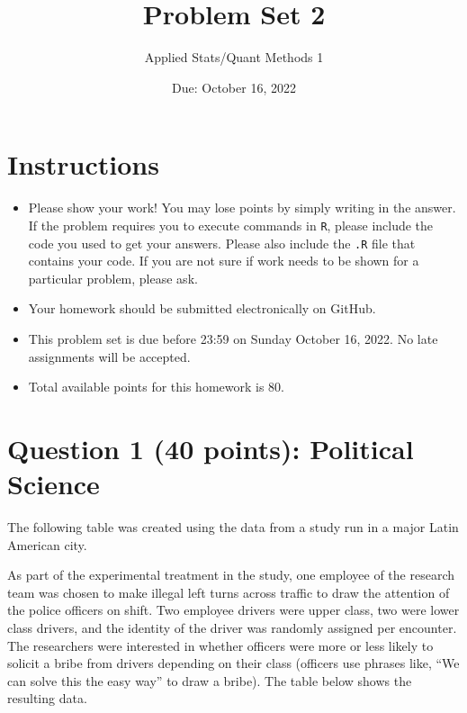 \documentclass[12pt,letterpaper]{article}
\title{Problem Set 2}
\date{Due: October 16, 2022}
\author{Applied Stats/Quant Methods 1}
\begin{document}
	\maketitle
	\section*{Instructions}
\begin{itemize}
	\item Please show your work! You may lose points by simply writing in the answer. If the problem requires you to execute commands in \texttt{R}, please include the code you used to get your answers. Please also include the \texttt{.R} file that contains your code. If you are not sure if work needs to be shown for a particular problem, please ask.
	\item Your homework should be submitted electronically on GitHub.
	\item This problem set is due before 23:59 on Sunday October 16, 2022. No late assignments will be accepted.
	\item Total available points for this homework is 80.
\end{itemize}

	\vspace{.5cm}
	\section*{Question 1 (40 points): Political Science}
		\vspace{.25cm}
	The following table was created using the data from a study run in a major Latin American city.

As part of the experimental treatment in the study, one employee of the research team was chosen to make illegal left turns across traffic to draw the attention of the police officers on shift. Two employee drivers were upper class, two were lower class drivers, and the identity of the driver was randomly assigned per encounter. The researchers were interested in whether officers were more or less likely to solicit a bribe from
drivers depending on their class (officers use phrases like, ``We can solve this the easy way'' to draw a bribe). The table below shows the resulting data.
\end{document}
